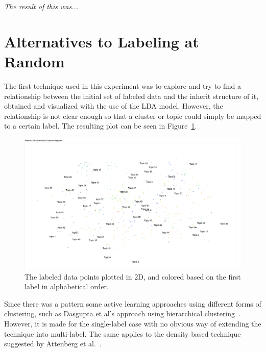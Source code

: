 \textit{The result of this was...}

\section{Alternatives to Labeling at Random}

The first technique used in this experiment was to explore and try to find a relationship between the initial set of labeled data and the inherit structure of it, obtained and visualized with the use of the LDA model.
However, the relationship is not clear enough so that a cluster or topic could simply be mapped to a certain label.
The resulting plot can be seen in Figure~\ref{fig:categories-lda-50}.

\begin{figure}
    \centering
    \includegraphics[scale=0.35, angle=270]{figures/categories-lda-50.png}
    \caption{The labeled data points plotted in 2D, and colored based on the first label in alphabetical order.}
    \label{fig:categories-lda-50}
\end{figure}

Since there was a pattern some active learning approaches using different forms of clustering, such as Dasgupta et al\@'s approach using hierarchical clustering~\cite{dasgupta2008hierarchical}.
However, it is made for the single-label case with no obvious way of extending the technique into multi-label.
The same applies to the density based technique suggested by Attenberg et al\@.~\cite{attenberg2013class}.
